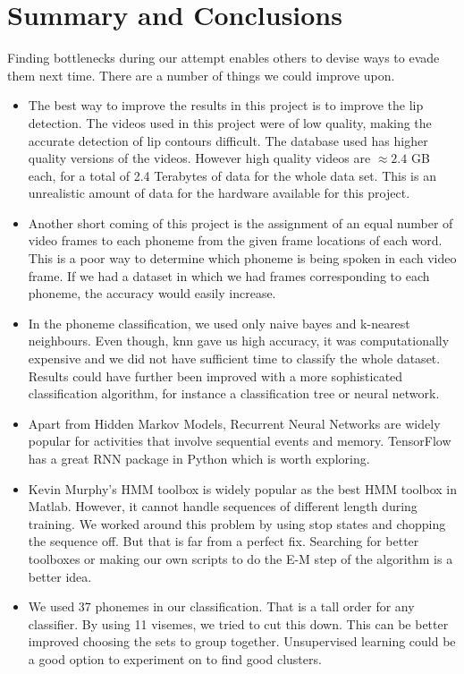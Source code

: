 \documentclass[a4paper]{article}
\begin{document}
\section{Summary and Conclusions}


Finding bottlenecks during our attempt enables others to devise ways to evade them next time. There are a number of things we could improve upon.
\begin{itemize}
	\item The best way to improve the results in this project is to improve the lip detection.  The videos used in this project were of low quality, making the accurate detection of lip contours difficult.  The database used has higher quality versions of the videos. However high quality videos are $\approx 2.4$ GB each, for a total of 2.4 Terabytes of data for the whole data set.  This is an unrealistic amount of data for the hardware available for this project.
	\item Another short coming of this project is the assignment of an equal number of video frames to each phoneme from the given frame locations of each word.  This is a poor way to determine which phoneme is being spoken in each video frame. If we had a dataset in which we had frames corresponding to each phoneme, the accuracy would easily increase.
	\item In the phoneme classification, we used only naive bayes and k-nearest neighbours. Even though, knn gave us high accuracy, it was computationally expensive and we did not have sufficient time to classify the whole dataset. Results could have further been improved with a more sophisticated classification algorithm, for instance a classification tree or neural network.
	\item Apart from Hidden Markov Models, Recurrent Neural Networks are widely popular for activities that involve sequential events and memory. TensorFlow has a great RNN package in Python which is worth exploring.
	\item Kevin Murphy's HMM toolbox is widely popular as the best HMM toolbox in Matlab. However, it cannot handle sequences of different length during training. We worked around this problem by using stop states and chopping the sequence off. But that is far from a perfect fix. Searching for better toolboxes or making our own scripts to do the E-M step of the algorithm is a better idea. 
	\item We used 37 phonemes in our classification. That is a tall order for any classifier. By using 11 visemes, we tried to cut this down. This can be better improved choosing the sets to group together. Unsupervised learning could be a good option to experiment on to find good clusters.
	

\end{itemize}
\end{document}
